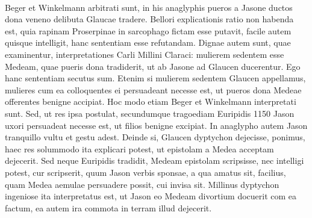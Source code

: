 \documentclass[a4paper, 11pt, oneside, polutonikogreek, german]{article}
\begin{document}
\paragraph{}
Beger et Winkelmann arbitrati sunt, in his anaglyphis pueros a Jasone ductos dona veneno delibuta Glaucae tradere. Bellori explicationis ratio non habenda est, quia rapinam Proserpinae in sarcophago fictam esse putavit, facile autem quisque intelligit, hanc sententiam esse refutandam. Dignae autem sunt, quae examinentur, interpretationes Carli Millini Claraci: mulierem sedentem esse Medeam, quae pueris dona tradiderit, ut ab Jasone ad Glaucen ducerentur. Ego hanc sententiam secutus sum. Etenim si mulierem sedentem Glaucen appellamus, mulieres cum ea colloquentes ei persuadeant necesse est, ut pueros dona Medeae offerentes benigne accipiat. Hoc modo etiam Beger et Winkelmann interpretati sunt. Sed, ut res ipsa postulat, secundumque tragoediam Euripidis 1150 Jason uxori persuadeat necesse est, ut filios benigne excipiat. In anaglypho autem Jason tranquillo vultu et gestu adest. Deinde si, Glaucen dyptychon dejecisse, ponimus, haec res solummodo ita explicari potest, ut epistolam a Medea acceptam dejecerit. Sed neque Euripidis tradidit, Medeam epistolam scripsisse, nec intelligi potest, cur scripserit, quum Jason verbis sponsae, a qua amatus sit, facilius, quam Medea aemulae persuadere possit, cui invisa sit. Millinus dyptychon ingeniose ita interpretatus est, ut Jason eo Medeam divortium docuerit com ea factum, ea autem ira commota in terram illud dejecerit.
\end{document}
